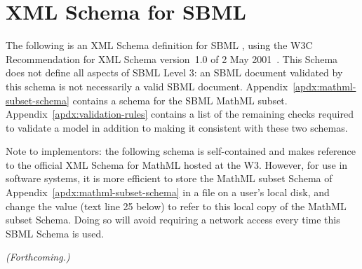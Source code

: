 
\section{XML Schema for SBML}
\label{apdx:schema}

The following is an XML Schema definition for SBML \thisLV, using
the W3C Recommendation for XML Schema version~1.0 of 2 May
2001~\citep{biron:2000,fallside:2000,thompson:2000}.  This Schema
does not define all aspects of SBML Level 3: an SBML document
validated by this schema is not necessarily a valid SBML \thisLV
document.  Appendix~\ref{apdx:mathml-subset-schema} contains a
schema for the SBML MathML subset.
Appendix~\ref{apdx:validation-rules} contains a list of the
remaining checks required to validate a model in addition
to making it consistent with these two schemas.

Note to implementors: the following schema is
self-contained and makes reference to the official XML Schema for
MathML hosted at the W3.  However, for use in software systems, it
is more efficient to store the MathML subset Schema of
Appendix~\ref{apdx:mathml-subset-schema} in a file on a user's
local disk, and change the  value
(text line 25 below)
to refer to this local copy of the MathML subset Schema.
Doing so will avoid requiring a network access every time this
SBML Schema is used.

\emph{(Forthcoming.)}

